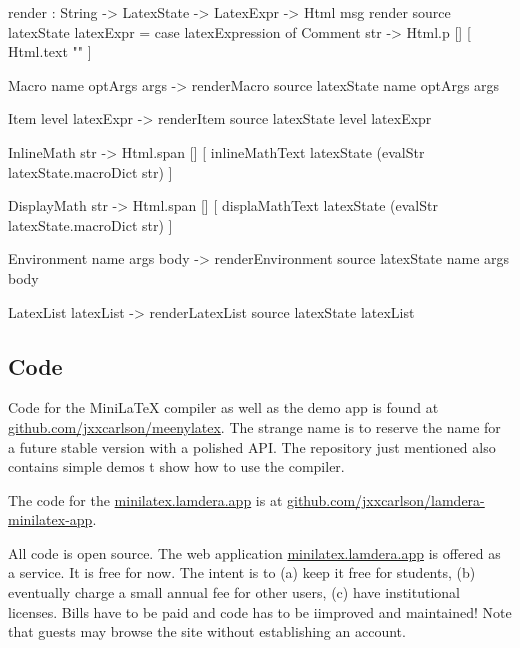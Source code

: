 \begin{listing}
render : String -> LatexState -> LatexExpr -> Html msg
render source latexState latexExpr =
    case latexExpression of
        Comment str ->
            Html.p [] [ Html.text "" ]

        Macro name optArgs args ->
            renderMacro source latexState name optArgs args

        Item level latexExpr ->
            renderItem source latexState level latexExpr

        InlineMath str ->
            Html.span [] [ 
              inlineMathText 
                latexState 
               (evalStr  latexState.macroDict str) ]

        DisplayMath str ->
            Html.span [] [ 
              displaMathText 
                latexState 
               (evalStr  latexState.macroDict str) ]

        Environment name args body ->
            renderEnvironment source latexState name args body

        LatexList latexList ->
            renderLatexList source latexState latexList
\end{listing}

\subsection{Code}

Code for the MiniLaTeX compiler as well as the demo app is found at \href{https://github.com/jxxcarlson/meenylatex}{github.com/jxxcarlson/meenylatex}.  The strange name is to reserve the name  for a future stable version with a polished API.  The repository just mentioned also contains simple demos t show how to use the compiler.

The code for the \href{https://minilatex.lamdera.app}{minilatex.lamdera.app} is at \href{https://github.com/jxxcarlson/lamdera-minilatex-app}{github.com/jxxcarlson/lamdera-minilatex-app}.

All code is open source. The web application \href{https://minilatex.lamdera.app}{minilatex.lamdera.app}  is offered as a service. It is free for now. The intent is to (a) keep it free for students, (b) eventually charge a small annual fee for other users, (c) have institutional licenses. Bills have to be paid and code has to be iimproved and maintained!  Note that guests may browse the site without establishing an account.



